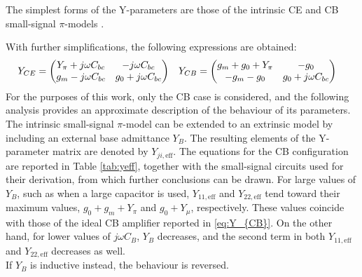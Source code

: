 The simplest forms of the Y-parameters are those of the intrinsic CE and CB small-signal $\pi$-models \cite{High-Frequency Integrated Circuits}. 

With further simplifications, the following expressions are obtained:
\begin{align}
  Y_{CE}&=    \begin{pmatrix}
Y_{\pi}+j\omega C_{bc} & -j\omega C_{bc} \\
g_m -j\omega C_{bc} & g_0+j\omega C_{bc}
\end{pmatrix} &
  Y_{CB}&=  \begin{pmatrix}
g_m+g_0+Y_{\pi} & -g_0 \\
-g_m -g_0 & g_0 +j\omega C_{bc}
\label{eq:Y_{CB}}
\end{pmatrix}
\end{align}
\noindent
For the purposes of this work, only the CB case is considered, and the following analysis provides an approximate description of the behaviour of its parameters.\\
The intrinsic small-signal $\pi$-model can be extended to an extrinsic model by including an external base admittance $Y_B$. The resulting elements of the Y-parameter matrix are denoted by $Y_{ji,\mathrm{eff}}$.
The equations for the CB configuration are reported in Table \ref{tab:yeff}, together with the small-signal circuits used for their derivation, from which further conclusions can be drawn. For large values of $Y_B$, such as when a large capacitor is used, $Y_{11,\mathrm{eff}}$ and $Y_{22,\mathrm{eff}}$ tend toward their maximum values, $g_0+g_m+Y_\pi$ and $g_0+Y_\mu$, respectively. These values coincide with those of the ideal CB amplifier reported in \eqref{eq:Y_{CB}}.
On the other hand, for lower values of $j\omega C_B$, $Y_B$ decreases, and the second term in both $Y_{11,\mathrm{eff}}$ and $Y_{22,\mathrm{eff}}$ decreases as well.\\
If $Y_B$ is inductive instead, the behaviour is reversed.
\mbox{}\\

